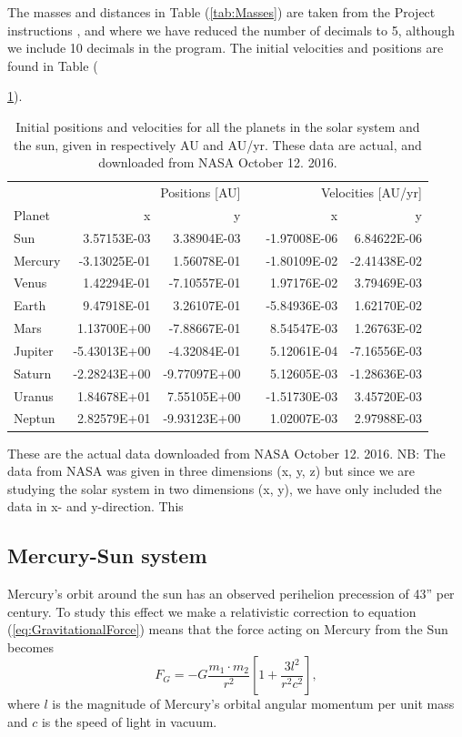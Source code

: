 \documentclass[norsk,a4paper,12pt]{article}
\begin{document}
The masses and distances in Table (\ref{tab:Masses}) are taken from the Project instructions \cite{Project_text}, and where we have reduced the number of decimals to 5, although we include 10 decimals in the program. The initial velocities and positions are found in Table ({\ref{tab:Positions}).
\begin{table}[H]
\centering
\caption{Initial positions and velocities for all the planets in the solar system and the sun, given in respectively AU and AU/yr. These data are actual, and downloaded from NASA October 12. 2016.}
\label{tab:Positions}
\begin{tabularx}{\textwidth}{lrrrrr}
\toprule
\multicolumn{3}{r}{Positions [AU]} & \multicolumn{3}{r}{Velocities [AU/yr]} \\
\cline{2-3}
\cline{5-6}
Planet           & x & y &  & x & y \\
\midrule
Sun          & 3.57153E-03  & 3.38904E-03  & & -1.97008E-06 & 6.84622E-06  \\
Mercury      & -3.13025E-01 & 1.56078E-01  & & -1.80109E-02 & -2.41438E-02 \\
Venus        & 1.42294E-01  & -7.10557E-01 & & 1.97176E-02  & 3.79469E-03  \\
Earth        & 9.47918E-01  & 3.26107E-01  & & -5.84936E-03 & 1.62170E-02  \\
Mars         & 1.13700E+00  & -7.88667E-01 & & 8.54547E-03  & 1.26763E-02  \\
Jupiter      & -5.43013E+00 & -4.32084E-01 & & 5.12061E-04  & -7.16556E-03 \\
Saturn       & -2.28243E+00 & -9.77097E+00 & & 5.12605E-03  & -1.28636E-03 \\
Uranus 		 & 1.84678E+01  & 7.55105E+00  & & -1.51730E-03 & 3.45720E-03  \\
Neptun 		 & 2.82579E+01  & -9.93123E+00 & & 1.02007E-03  & 2.97988E-03  \\
\bottomrule
\end{tabularx}
\end{table}
These are the actual data downloaded from NASA \cite{NASA} October 12. 2016. NB: The data from NASA was given in three dimensions (x, y, z) but since we are studying the solar system in two dimensions (x, y), we have only included the data in x- and y-direction. This \par\vspace{3mm}

\subsection{Mercury-Sun system}
Mercury's orbit around the sun has an observed perihelion precession of 43'' per century. To study this effect we make a relativistic correction to equation (\ref{eq:GravitationalForce}) means that the force acting on Mercury from the Sun becomes
\begin{equation}
F_G=-G\frac{m_1\cdot m_2}{r^2} \left[1 + \frac{3l^2}{r^2c^2}\right], 
\label{eq:GravitationalForceRelativistic}
\end{equation}
where $l$ is the magnitude of Mercury's orbital angular momentum per unit mass and $c$ is the speed of light in vacuum. 

}
\end{document}

